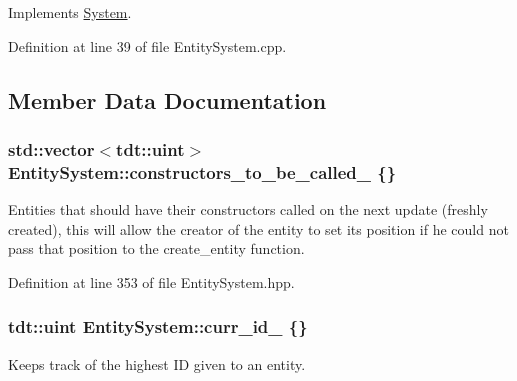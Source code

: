 Implements \hyperlink{class_system_a6d54c9bd38eb43d620a1451cb0925472}{System}.



Definition at line 39 of file Entity\+System.\+cpp.



\subsection{Member Data Documentation}
\subsubsection[{\texorpdfstring{constructors\+\_\+to\+\_\+be\+\_\+called\+\_\+}{constructors_to_be_called_}}]{\setlength{\rightskip}{0pt plus 5cm}std\+::vector$<$tdt\+::uint$>$ Entity\+System\+::constructors\+\_\+to\+\_\+be\+\_\+called\+\_\+ \{\}\hspace{0.3cm}{\ttfamily [private]}}\hypertarget{class_entity_system_a76d26bc7c90c53486205b597dfdca7d1}{}\label{class_entity_system_a76d26bc7c90c53486205b597dfdca7d1}


Entities that should have their constructors called on the next update (freshly created), this will allow the creator of the entity to set it\textquotesingle{}s position if he could not pass that position to the create\+\_\+entity function. 



Definition at line 353 of file Entity\+System.\+hpp.

\subsubsection[{\texorpdfstring{curr\+\_\+id\+\_\+}{curr_id_}}]{\setlength{\rightskip}{0pt plus 5cm}tdt\+::uint Entity\+System\+::curr\+\_\+id\+\_\+ \{\}\hspace{0.3cm}{\ttfamily [private]}}\hypertarget{class_entity_system_a287ccbe3b51f6e8d6d1b5f43cf238621}{}\label{class_entity_system_a287ccbe3b51f6e8d6d1b5f43cf238621}


Keeps track of the highest ID given to an entity. 



